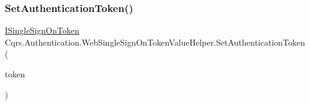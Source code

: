 \subsubsection{\texorpdfstring{Set\+Authentication\+Token()}{SetAuthenticationToken()}\hspace{0.1cm}{\footnotesize\ttfamily [4/4]}}
{\footnotesize\ttfamily \hyperlink{interfaceCqrs_1_1Authentication_1_1ISingleSignOnToken}{I\+Single\+Sign\+On\+Token} Cqrs.\+Authentication.\+Web\+Single\+Sign\+On\+Token\+Value\+Helper.\+Set\+Authentication\+Token (\begin{DoxyParamCaption}\item[{\hyperlink{interfaceCqrs_1_1Authentication_1_1ISingleSignOnToken}{I\+Single\+Sign\+On\+Token}}]{token }\end{DoxyParamCaption})}

